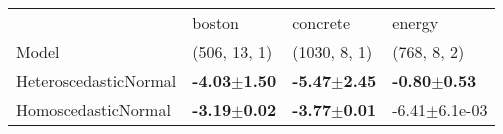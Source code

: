 \begin{tabular}{llll}
\toprule
{} &                            boston &                          concrete &                            energy \\
Model& (506, 13, 1)& (1030, 8, 1)& (768, 8, 2)\\
\midrule
HeteroscedasticNormal &           \textbf{-4.03$\pm$1.50} &           \textbf{-5.47$\pm$2.45} &  \textbf{\textbf{-0.80$\pm$0.53}} \\
HomoscedasticNormal   &  \textbf{\textbf{-3.19$\pm$0.02}} &  \textbf{\textbf{-3.77$\pm$0.01}} &                 -6.41$\pm$6.1e-03 \\
\bottomrule
\end{tabular}

